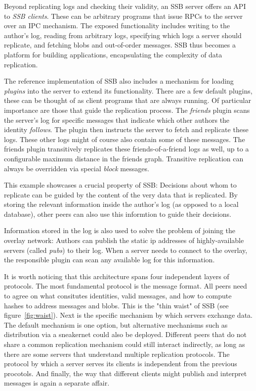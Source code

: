 \documentclass[sigconf]{acmart}
\begin{document}
Beyond replicating logs and checking their validity, an SSB server offers an API to {\em SSB clients}. These can be arbitrary programs that issue RPCs to the server over an IPC mechanism. The exposed functionality includes writing to the author's log, reading from arbitrary logs, specifying which logs a server should replicate, and fetching blobs and out-of-order messages. SSB thus becomes a platform for building applications, encapsulating the complexity of data replication.

The reference implementation of SSB also includes a mechanism for loading {\em plugins} into the server to extend its functionality. There are a few default plugins, these can be thought of as client programs that are always running. Of particular importance are those that guide the replication process. The {\em friends} plugin scans the server's log for specific messages that indicate which other authors the identity {\em follows}. The plugin then instructs the server to fetch and replicate these logs. These other logs might of course also contain some of these messages. The friends plugin transitively replicates these friends-of-a-friend logs as well, up to a configurable maximum distance in the friends graph. Transitive replication can always be overridden via special {\em block} messages.

This example showcases a crucial property of SSB: Decisions about whom to replicate can be guided by the content of the very data that is replicated. By storing the relevant information inside the author's log (as opposed to a local database), other peers can also use this informtion to guide their decisions.

Information stored in the log is also used to solve the problem of joining the overlay network: Authors can publish the static ip addresses of highly-available servers (called {\em pubs}) to their log. When a server needs to connect to the overlay, the responsible plugin can scan any available log for this information.

It is worth noticing that this architecture spans four independent layers of protocols. The most fundamental protocol is the message format. All peers need to agree on what consitutes identities, valid messages, and how to compute hashes to address messages and blobs. This is the "thin waist" of SSB (see figure~\ref{fig:waist}).
Next is the specific mechanism by which servers exchange data. The default mechanism is one option, but alternative mechanisms such as distribution via a sneakernet could also be deployed. Different peers that do not share a common replication mechanism could still interact indirectly, as long as there are some servers that understand multiple replication protocols. The protocol by which a server serves its clients is independent from the previous procotols. And finally, the way that different clients might publish and interpret messages is again a separate affair.
\end{document}
